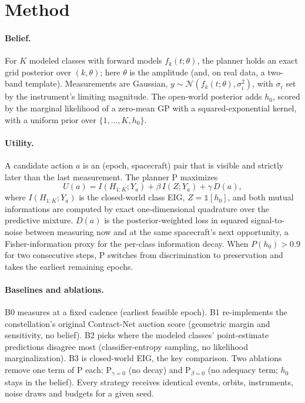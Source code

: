 \section{Method}\label{sec:method}
\paragraph{Belief.} For $K$ modeled classes with forward models $f_k(t;\theta)$, the planner holds an exact grid posterior over $(k,\theta)$; here $\theta$ is the amplitude (and, on real data, a two-band template). Measurements are Gaussian, $y\sim\mathcal N(f_k(t;\theta),\sigma_i^2)$, with $\sigma_i$ set by the instrument's limiting magnitude. The open-world posterior adds $h_0$, scored by the marginal likelihood of a zero-mean GP with a squared-exponential kernel, with a uniform prior over $\{1,\dots,K,h_0\}$.

\paragraph{Utility.} A candidate action $a$ is an (epoch, spacecraft) pair that is visible and strictly later than the last measurement. The planner P maximizes
\begin{equation}
U(a) = I(H_{1:K};Y_a) + \beta\, I(Z;Y_a) + \gamma\, D(a),
\end{equation}
where $I(H_{1:K};Y_a)$ is the closed-world class EIG, $Z=\mathbb 1[h_0]$, and both mutual informations are computed by exact one-dimensional quadrature over the predictive mixture. $D(a)$ is the posterior-weighted loss in squared signal-to-noise between measuring now and at the same spacecraft's next opportunity, a Fisher-information proxy for the per-class information decay. When $P(h_0)>0.9$ for two consecutive steps, P switches from discrimination to preservation and takes the earliest remaining epochs.

\paragraph{Baselines and ablations.} B0 measures at a fixed cadence (earliest feasible epoch). B1 re-implements the constellation's original Contract-Net auction score (geometric margin and sensitivity, no belief). B2 picks where the modeled classes' point-estimate predictions disagree most (classifier-entropy sampling, no likelihood marginalization). B3 is closed-world EIG, the key comparison. Two ablations remove one term of P each: P$_{\gamma=0}$ (no decay) and P$_{\beta=0}$ (no adequacy term; $h_0$ stays in the belief). Every strategy receives identical events, orbits, instruments, noise draws and budgets for a given seed.

